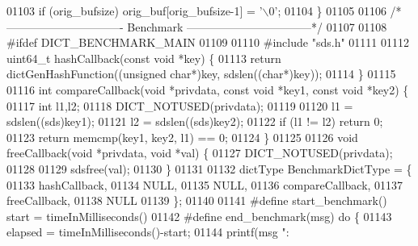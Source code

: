 \begin{DoxyCode}
{{{{{{{{01103     \textcolor{keywordflow}{if} (orig\_bufsize) orig\_buf[orig\_bufsize-1] = \textcolor{stringliteral}{'\(\backslash\)0'};
01104 \}
01105 
01106 \textcolor{comment}{/* ------------------------------- Benchmark ---------------------------------*/}
01107 
01108 \textcolor{preprocessor}{#}\textcolor{preprocessor}{ifdef} \textcolor{preprocessor}{DICT\_BENCHMARK\_MAIN}
01109 
01110 \textcolor{preprocessor}{#}\textcolor{preprocessor}{include} \textcolor{stringliteral}{"sds.h"}
01111 
01112 uint64\_t hashCallback(\textcolor{keyword}{const} \textcolor{keywordtype}{void} *key) \{
01113     \textcolor{keywordflow}{return} dictGenHashFunction((\textcolor{keywordtype}{unsigned} \textcolor{keywordtype}{char}*)key, sdslen((\textcolor{keywordtype}{char}*)key));
01114 \}
01115 
01116 \textcolor{keywordtype}{int} compareCallback(\textcolor{keywordtype}{void} *privdata, \textcolor{keyword}{const} \textcolor{keywordtype}{void} *key1, \textcolor{keyword}{const} \textcolor{keywordtype}{void} *key2) \{
01117     \textcolor{keywordtype}{int} l1,l2;
01118     DICT\_NOTUSED(privdata);
01119 
01120     l1 = sdslen((sds)key1);
01121     l2 = sdslen((sds)key2);
01122     \textcolor{keywordflow}{if} (l1 != l2) \textcolor{keywordflow}{return} 0;
01123     \textcolor{keywordflow}{return} memcmp(key1, key2, l1) == 0;
01124 \}
01125 
01126 \textcolor{keywordtype}{void} freeCallback(\textcolor{keywordtype}{void} *privdata, \textcolor{keywordtype}{void} *val) \{
01127     DICT\_NOTUSED(privdata);
01128 
01129     sdsfree(val);
01130 \}
01131 
01132 dictType BenchmarkDictType = \{
01133     hashCallback,
01134     NULL,
01135     NULL,
01136     compareCallback,
01137     freeCallback,
01138     NULL
01139 \};
01140 
01141 \textcolor{preprocessor}{#}\textcolor{preprocessor}{define} \textcolor{preprocessor}{start\_benchmark}\textcolor{preprocessor}{(}\textcolor{preprocessor}{)} \textcolor{preprocessor}{start} \textcolor{preprocessor}{=} \textcolor{preprocessor}{timeInMilliseconds}\textcolor{preprocessor}{(}\textcolor{preprocessor}{)}
01142 \textcolor{preprocessor}{#}\textcolor{preprocessor}{define} \textcolor{preprocessor}{end\_benchmark}\textcolor{preprocessor}{(}\textcolor{preprocessor}{msg}\textcolor{preprocessor}{)} \textcolor{preprocessor}{do} \textcolor{preprocessor}{\{}
01143     \textcolor{preprocessor}{elapsed} \textcolor{preprocessor}{=} \textcolor{preprocessor}{timeInMilliseconds}\textcolor{preprocessor}{(}\textcolor{preprocessor}{)}\textcolor{preprocessor}{-}\textcolor{preprocessor}{start}\textcolor{preprocessor}{;}
01144     \textcolor{preprocessor}{printf}\textcolor{preprocessor}{(}\textcolor{preprocessor}{msg} \textcolor{stringliteral}{": %
}}}}}}}}}
\end{DoxyCode}
